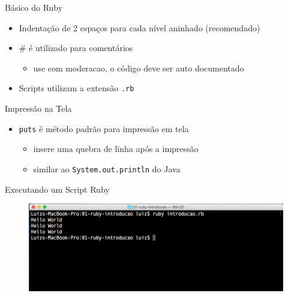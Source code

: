 \begin{frame}[fragile,t]{Básico do Ruby}
  \begin{itemize}
    \item Indentação de 2 espaços para cada nível aninhado (recomendado)
    \item \# é utilizado para comentários
    \begin{itemize}
    	\item use com moderacao, o código deve ser auto documentado
    \end{itemize}
    \item Scripts utilizam a extensão \verb!.rb!
    
	
  \end{itemize}   
\end{frame}

\begin{frame}[fragile,t]{Impressão na Tela}
  \begin{itemize}
    \item \verb!puts! é método padrão para impressão em tela 
    \begin{itemize}
    	\item insere uma quebra de linha após a impressão
    	\item similar ao \verb!System.out.println! do Java
    \end{itemize}
  \end{itemize}   
\end{frame}

\begin{frame}{Executando um Script Ruby}
  \begin{figure}[hbt]
    \includegraphics[scale=.25]{imagens/ruby-interpretador.png}
  \end{figure}
\end{frame}

